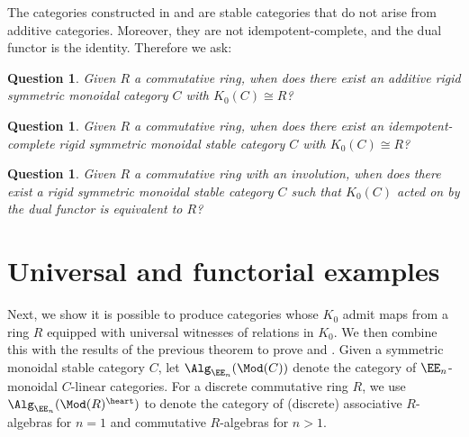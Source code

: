\documentclass[12pt,oneside]{article}
\newcounter{counter}
\newtheorem{qst}[counter]{Question}
\begin{document}

	The categories constructed in  and  are stable categories that do not arise from additive categories. Moreover, they are not idempotent-complete, and the dual functor is the identity. Therefore we ask:

	\begin{qst}\label{qst:add}
		Given $R$ a commutative ring, when does there exist an additive rigid symmetric monoidal category $C$ with $K_0(C)\cong R$?
	\end{qst}
	
	\begin{qst}\label{qst:ide}
		Given $R$ a commutative ring, when does there exist an idempotent-complete rigid symmetric monoidal stable category $C$ with $K_0(C)\cong R$?
	\end{qst}

	\begin{qst}\label{qst:dual}
		Given $R$ a commutative ring with an involution, when does there exist a rigid symmetric monoidal stable category $C$ such that $K_0(C)$ acted on by the dual functor is equivalent to $R$?
	\end{qst}
%	

\section{Universal and functorial examples}

	Next, we show it is possible to produce categories whose $K_0$ admit maps from a ring $R$ equipped with universal witnesses of relations in $K_0$. We then combine this with the results of the previous theorem to prove  and . Given a symmetric monoidal stable category $C$, let $\Alg_{\EE_n}(\Mod(C))$ denote the category of $\EE_n$-monoidal $C$-linear categories. For a discrete commutative ring $R$, we use $\Alg_{\EE_n}(\Mod(R)^{\heart})$ to denote the category of (discrete) associative $R$-algebras for $n=1$ and commutative $R$-algebras for $n>1$.
	
\end{document}
